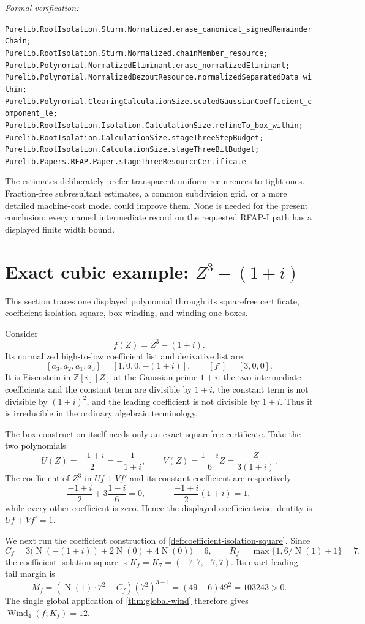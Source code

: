 \documentclass[11pt]{article}
\newcommand{\Zi}{\mathbb{Z}[i]}
\newcommand{\Norm}[1]{\operatorname{N}\!\left(#1\right)}
\newcommand{\Wind}{\operatorname{Wind}}
\newcommand{\leanref}[1]{\par\smallskip\noindent
  \emph{Formal verification:}\par\nobreak
  {\raggedright\nolinkurl{#1}.\par}}
\begin{document}
\leanref{Purelib.RootIsolation.Sturm.Normalized.erase_canonical_signedRemainderChain;
Purelib.RootIsolation.Sturm.Normalized.chainMember_resource;
Purelib.Polynomial.NormalizedEliminant.erase_normalizedEliminant;
Purelib.Polynomial.NormalizedBezoutResource.normalizedSeparatedData_within;
Purelib.Polynomial.ClearingCalculationSize.scaledGaussianCoefficient_component_le;
Purelib.RootIsolation.Isolation.CalculationSize.refineTo_box_within;
Purelib.RootIsolation.CalculationSize.stageThreeStepBudget;
Purelib.RootIsolation.CalculationSize.stageThreeBitBudget;
Purelib.Papers.RFAP.Paper.stageThreeResourceCertificate}

The estimates deliberately prefer transparent uniform recurrences to tight
ones.  Fraction-free subresultant estimates, a common subdivision grid, or a
more detailed machine-cost model could improve them.  None is needed for the
present conclusion: every named intermediate record on the requested RFAP-I
path has a displayed finite width bound.

\section{Exact cubic example: \texorpdfstring{$Z^3-(1+i)$}{Z cubed minus (1+i)}}

This section traces one displayed polynomial through its squarefree
certificate, coefficient isolation square, box winding, and winding-one
boxes.

Consider
\[
            f(Z)=Z^3-(1+i).
\]
Its normalized high-to-low coefficient list and derivative list are
\[
 [a_3,a_2,a_1,a_0]=[1,0,0,-(1+i)],\qquad
 [f']=[3,0,0].
\]
It is Eisenstein in $\Zi[Z]$ at the Gaussian prime $1+i$: the two
intermediate coefficients and the constant term are divisible by $1+i$,
the constant term is not divisible by $(1+i)^2$, and the leading coefficient
is not divisible by $1+i$.  Thus it is irreducible in the ordinary algebraic
terminology.

The box construction itself needs only an exact squarefree certificate.  Take
the two polynomials
\[
 U(Z)=\frac{-1+i}{2}=-\frac1{1+i},\qquad
 V(Z)=\frac{1-i}{6}Z=\frac{Z}{3(1+i)}.
\]
The coefficient of $Z^3$ in $Uf+Vf'$ and its constant coefficient are
respectively
\[
 \frac{-1+i}{2}+3\frac{1-i}{6}=0,
 \qquad
 -\frac{-1+i}{2}(1+i)=1,
\]
while every other coefficient is zero.  Hence the displayed coefficientwise
identity is $Uf+Vf'=1$.

We next run the coefficient construction of
\cref{def:coefficient-isolation-square}.  Since
\[
 C_f=3\bigl(\Norm{-(1+i)}+2\Norm0+4\Norm0\bigr)=6,
 \qquad
 R_f=\max\{1,6/\Norm1+1\}=7,
\]
the coefficient isolation square is $K_f=K_7=(-7,7,-7,7)$.  Its exact
leading--tail margin is
\[
 M_f=(\Norm1\cdot7^2-C_f)(7^2)^{3-1}
     =(49-6)49^2=103243>0.
\]
The single global application of \cref{thm:global-wind} therefore gives
$\Wind_4(f;K_f)=12$.
\end{document}
